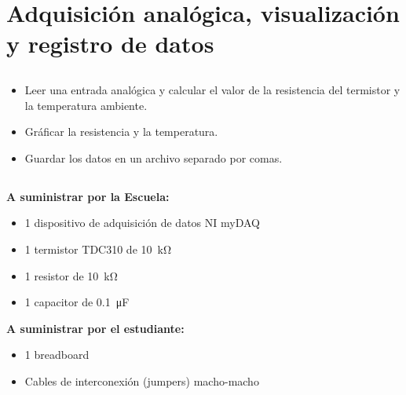 \chapter{Adquisición analógica, visualización y registro de datos}
\section{\obj}
\capacidad
\begin{itemize}
\item Leer una entrada analógica y calcular el valor de la resistencia del termistor y la temperatura ambiente.
\item Gráficar la resistencia y la temperatura.
\item Guardar los datos en un archivo separado por comas.
\end{itemize}

\section{\mat}
\textbf{A suministrar por la Escuela:}
\begin{itemize}
\item 1 dispositivo de adquisición de datos NI myDAQ
\item 1 termistor TDC310 de \SI{10}{\kilo\ohm}
\item 1 resistor de \SI{10}{\kilo\ohm}
\item 1 capacitor de \SI{0.1}{\micro\farad}

\end{itemize}
\textbf{A suministrar por el estudiante:}
\begin{itemize}
\item 1 breadboard
\item Cables de interconexión (jumpers) macho-macho
\end{itemize}


